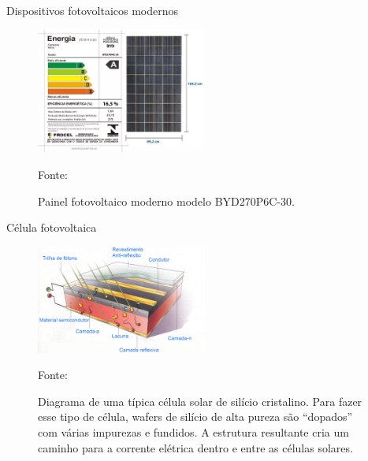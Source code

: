 \documentclass{beamer}
\begin{document}
\begin{frame}{Dispositivos fotovoltaicos modernos   }

\begin{figure}[ht]
    \centering
    \includegraphics[width=0.5\textwidth]{./Figuras/BYD270P6C.jpg}
    \caption{Painel fotovoltaico moderno modelo BYD270P6C-30.}{Fonte: \cite{nortesulshop}}
   \label{fig:BYD270P6C}
\end{figure}

\end{frame}


\begin{frame}{Célula fotovoltaica}

\begin{figure}[ht]
    \centering
    \includegraphics[width=0.5\textwidth]{./Figuras/pv-cell.jpg}
    \caption{Diagrama de uma típica célula solar de silício cristalino. Para fazer esse tipo de célula, wafers de silício de alta pureza são “dopados” com várias impurezas e fundidos. A estrutura resultante cria um caminho para a corrente elétrica dentro e entre as células solares.}{Fonte: \cite{seia}}
   \label{fig:pv-cell}
\end{figure}

\end{frame}

\end{document}
